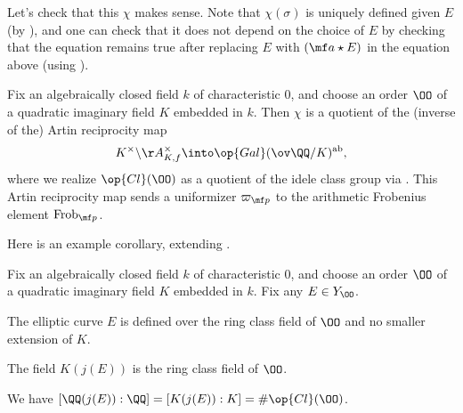 \documentclass[../notes.tex]{subfiles}
\begin{document}
\begin{remark}
	Let's check that this $\chi$ makes sense. Note that $\chi(\sigma)$ is uniquely defined given $E$ (by ), and one can check that it does not depend on the choice of $E$ by checking that the equation remains true after replacing $E$ with $(\mf a\star E)$ in the equation above (using ).
\end{remark}
\begin{theorem}[Main] \label{thm:main-cm}
	Fix an algebraically closed field $k$ of characteristic $0$, and choose an order $\OO$ of a quad\-ratic imaginary field $K$ embedded in $k$. Then $\chi$ is a quotient of the (inverse of the) Artin reciprocity map
	\[K^\times\backslash\AA_{K,f}^\times\into\op{Gal}(\ov\QQ/K)^{\mathrm{ab}},\]
	where we realize $\op{Cl}(\OO)$ as a quotient of the idele class group via . This Artin reciprocity map sends a uniformizer $\varpi_{\mf p}$ to the arithmetic Frobenius element $\mathrm{Frob}_{\mf p}$.
\end{theorem}
Here is an example corollary, extending .
\begin{corollary}
	Fix an algebraically closed field $k$ of characteristic $0$, and choose an order $\OO$ of a quad\-ratic imaginary field $K$ embedded in $k$. Fix any $E\in Y_\OO$.
	\begin{listalph}
		\item The elliptic curve $E$ is defined over the ring class field of $\OO$ and no smaller extension of $K$.
		\item The field $K(j(E))$ is the ring class field of $\OO$.
		\item We have $[\QQ(j(E)):\QQ]=[K(j(E)):K]=\#\op{Cl}(\OO)$.
	\end{listalph}
\end{corollary}
\end{document}
